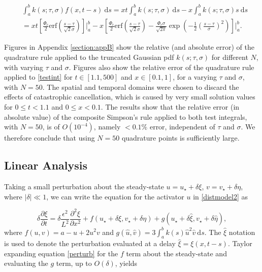 \begin{equation}
    \begin{split}
&\int_a^bk(s;\tau,\sigma)f(x,t-s)\ \text{d}s=xt\int_a^bk(s;\tau,\sigma)\ \text{d}s-x\int_a^bk(s;\tau,\sigma)s\ \text{d}s\\&=xt\left[\frac{\Phi_c}{2}\text{erf}\left(\frac{s-\tau}{\sqrt{2}\sigma}\right)\right]\bigg|_a^b-x\left[\frac{\Phi_c}{2}\text{erf}\left(\frac{s-\tau}{\sqrt{2}\sigma}\right)-\frac{\Phi_c\sigma}{\sqrt{2\pi}}\exp\left(-\frac{1}{2}\left(\frac{s-\tau}{\sigma}\right)^2 \right)\right]\Bigg|_a^b.
    \end{split}
\end{equation}

Figures in Appendix \ref{section:appB} show the relative (and absolute error) of the quadrature rule applied to the truncated Gaussian pdf $k(s;\tau,\sigma)$ for different $N$, with varying $\tau$ and $\sigma$. Figures also show the relative error of the quadrature rule applied to \eqref{testint} for $t\in[1.1,500]$ and $x\in[0.1,1]$, for a varying $\tau$ and $\sigma$, with $N=50$. The spatial and temporal domains were chosen to discard the effects of catastrophic cancellation, which is caused by very small solution values for $0\leq t<1.1$ and $0\leq x<0.1$. The results show that the relative error (in absolute value) of the composite Simpson's rule applied to both test integrals, with $N=50$, is of $O(10^{-4})$, namely $<0.1\%$ error, independent of $\tau$ and $\sigma$. We therefore conclude that using $N=50$ quadrature points is sufficiently large.


\subsection{Linear Analysis}\label{section:distlin}
Taking a small perturbation about the steady-state $u=u_\star+\delta\xi$, $v=v_\star+\delta\eta$, where $|\delta|\ll1$, we can write the equation for the activator $u$ in \eqref{distmodel2} as

\begin{equation}\label{perturb}
  \delta\frac{\partial \xi}{\partial t}=\delta \frac{\epsilon^2}{L^2}\frac{\partial^2\xi}{\partial x^2}+f(u_\star+\delta\xi, v_\star+\delta\eta)+g(u_\star+\delta\hat{\xi},v_\star+\delta\hat{\eta}) ,
\end{equation}
where $f(u,v)=a-u+2u^2v$ and $g(\hat{u},\hat{v})=3\int_a^bk(s)\hat{u}^2\hat{v}\ \text{d}s$. The $\hat{\xi}$ notation is used to denote the perturbation evaluated at a delay $\hat{\xi}=\xi(x,t-s)$. Taylor expanding equation \eqref{perturb} for the $f$ term about the steady-state and evaluating the $g$ term, up to $O(\delta)$, yields


